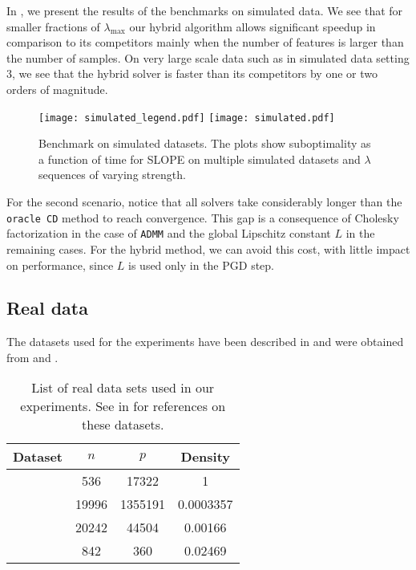 In , we present the results of the benchmarks on simulated data.
We see that for smaller fractions of $\lambda_{\text{max}}$ our hybrid algorithm allows significant speedup in comparison to its competitors mainly when the number of features is larger than the number of samples.
On very large scale data such as in simulated data setting $3$, we see that the hybrid solver is faster than its competitors by one or two orders of magnitude.

\begin{figure*}[!t]
  \centering
  \texttt{[image: simulated\_legend.pdf]}
  \texttt{[image: simulated.pdf]}
  \caption{Benchmark on simulated datasets. The plots show suboptimality as a function of time for SLOPE on multiple simulated datasets and $\lambda$ sequences of varying strength.}
  \label{fig:simulated}
\end{figure*}

For the second scenario, notice that all solvers take considerably longer than the \texttt{oracle CD} method to reach convergence.
This gap is a consequence of Cholesky factorization in the case of \texttt{ADMM} and the global Lipschitz constant \(L\) in the remaining cases.
For the hybrid method, we can avoid this cost, with little impact on performance, since \(L\) is used only in the PGD step.

\subsection{Real data}
\label{sec:experiments-real-data}

The datasets used for the experiments have been described in  and were obtained from \textcite{chang2011,chang2016} and \textcite{breheny2022}.

\begin{table}[hbt]
  \centering
  \caption{%
    List of real data sets used in our experiments.
    See  in  for references on these datasets.
  }
  \label{tab:real-data}
  \begin{tabular}{
      l
      S[table-format=5.0,round-mode=off]
      S[table-format=7.0,round-mode=off]
      S[table-format=1.5,round-mode=figures,round-precision=2]
    }
    \toprule
    Dataset            & {\(n\)} & {\(p\)} & {Density} \\ \midrule
       & 536     & 17322   & 1         \\
       & 19996   & 1355191 & 0.0003357 \\
         & 20242   & 44504   & 0.00166   \\
     & 842     & 360     & 0.02469   \\ \bottomrule
  \end{tabular}
\end{table}

